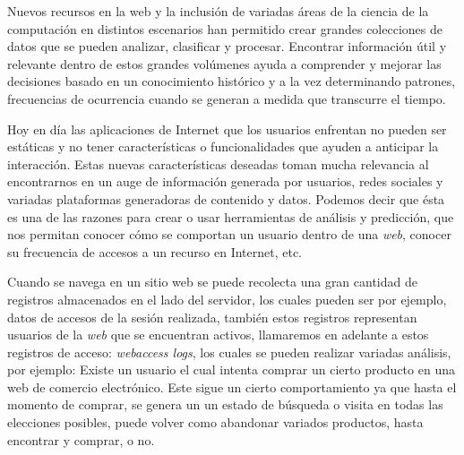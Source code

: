 

Nuevos recursos en la web y la inclusión de variadas áreas de la ciencia de la computación	en distintos escenarios han permitido crear grandes colecciones de datos que se pueden analizar, clasificar y procesar. Encontrar información útil y relevante dentro de estos grandes volúmenes ayuda a comprender y mejorar las decisiones basado en un conocimiento histórico  y a la vez determinando patrones, frecuencias de ocurrencia cuando se generan a medida que transcurre el tiempo. 


Hoy en día las aplicaciones de Internet que los usuarios enfrentan no pueden ser estáticas y no tener características o funcionalidades que ayuden a anticipar la interacción. Estas nuevas características deseadas toman mucha relevancia al encontrarnos en un auge de información generada por usuarios, redes sociales y variadas plataformas generadoras de contenido y datos. Podemos decir que ésta es una de las razones para  crear o usar  herramientas de análisis y predicción, que nos permitan conocer cómo se comportan un usuario  dentro de una \emph{web}, conocer su frecuencia de accesos a un recurso en Internet, etc.

Cuando se navega en un sitio web se puede recolecta una gran cantidad de registros almacenados en el lado del servidor, los cuales pueden ser por ejemplo, datos de accesos de la sesión realizada, también estos  registros representan usuarios de la \emph{web}  que se encuentran activos, llamaremos en adelante a estos registros de acceso: \emph{webaccess logs},   los cuales se pueden realizar variadas análisis, por ejemplo:  Existe un usuario el cual intenta comprar un cierto producto en una web de comercio electrónico. Este sigue un cierto comportamiento ya que hasta el momento de comprar, se genera un un estado de búsqueda o visita en todas las elecciones posibles, puede volver como abandonar variados productos, hasta encontrar y comprar, o no. 

